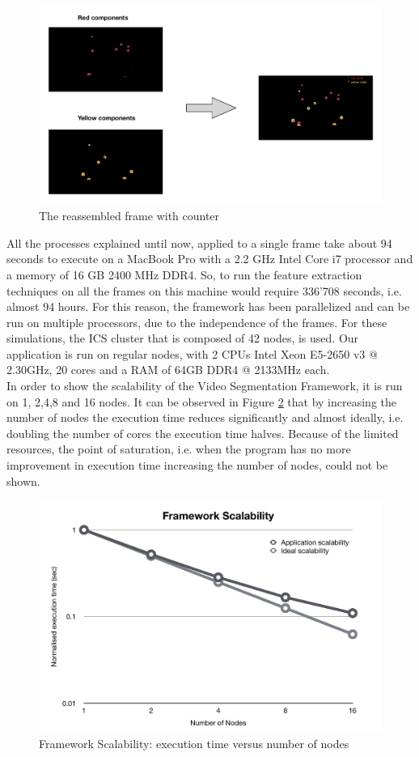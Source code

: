 \documentclass{usiinftr}
\begin{document}
\begin{figure}[h]
	\centering
	\includegraphics[width=0.8\linewidth]{./img/to_frame}
	\caption{The reassembled frame with counter}
	\label{fig:8}
\end{figure}

\noindent
All the processes explained until now, applied to a single frame take about 94 seconds to execute on a MacBook Pro with a 2.2 GHz Intel Core i7 processor and a memory of 16 GB 2400 MHz DDR4. So, to run the feature extraction techniques on all the frames on this machine would require 336'708 seconds, i.e. almost 94 hours. For this reason, the framework has been parallelized and can be run on multiple processors, due to the independence of the frames. For these simulations, the ICS cluster that is composed of 42 nodes, is used. Our application is run on regular nodes, with 2 CPUs Intel Xeon E5-2650 v3 @ 2.30GHz, 20 cores and a RAM of 64GB DDR4 @ 2133MHz each. \\
In order to show the scalability of the Video Segmentation Framework, it is run on 1, 2,4,8 and 16 nodes. It can be observed in Figure \ref{fig:9} that by increasing the number of nodes the execution time reduces significantly and almost ideally, i.e. doubling the number of cores the execution time halves. Because of the limited resources, the point of saturation, i.e. when the program has no more improvement in execution time increasing the number of nodes, could not be shown.

\begin{figure}[h]
	\centering
	\includegraphics[width=0.7\linewidth]{img/scalability}
	\caption{Framework Scalability: execution time versus number of nodes}
	\label{fig:9}
\end{figure}
\end{document}
